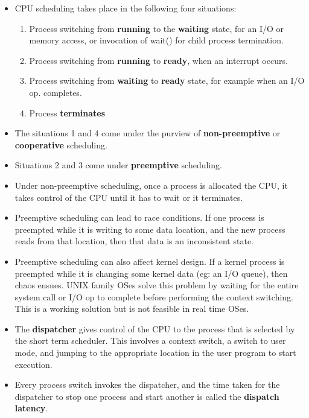 \documentclass{article}
\begin{document}
\begin{itemize}
    \item CPU scheduling takes place in the following four situations:
    \begin{enumerate}
        \item Process switching from \textbf{running} to the \textbf{waiting} state, for an I/O or memory access, or invocation of wait() for child process termination. 
        
        \item Process switching from \textbf{running} to \textbf{ready}, when an interrupt occurs.
        
        \item Process switching from \textbf{waiting} to \textbf{ready} state, for example when an I/O op. completes.
        
        \item Process \textbf{terminates}
    \end{enumerate}
    
    \item The situations 1 and 4 come under the purview of \textbf{non-preemptive} or \textbf{cooperative} scheduling. 
    
    \item Situations 2 and 3 come under \textbf{preemptive} scheduling. 
    
    \item Under non-preemptive scheduling, once a process is allocated the CPU, it takes control of the CPU until it has to wait or it terminates. 
    
    \item Preemptive scheduling can lead to race conditions. If one process is preempted while it is writing to some data location, and the new process reads from that location, then that data is an inconsistent state. 
    
    \item Preemptive scheduling can also affect kernel design. If a kernel process is preempted while it is changing some kernel data (eg: an I/O queue), then chaos ensues. UNIX family OSes solve this problem by waiting for the entire system call or I/O op to complete before performing the context switching. This is a working solution but is not feasible in real time OSes. 
    
    \item The \textbf{dispatcher} gives control of the CPU to the process that is selected by the short term scheduler. This involves a context switch, a switch to user mode, and jumping to the appropriate location in the user program to start execution. 
    
    \item Every process switch invokes the dispatcher, and the time taken for the dispatcher to stop one process and start another is called the \textbf{dispatch latency}.
\end{itemize}
\end{document}
